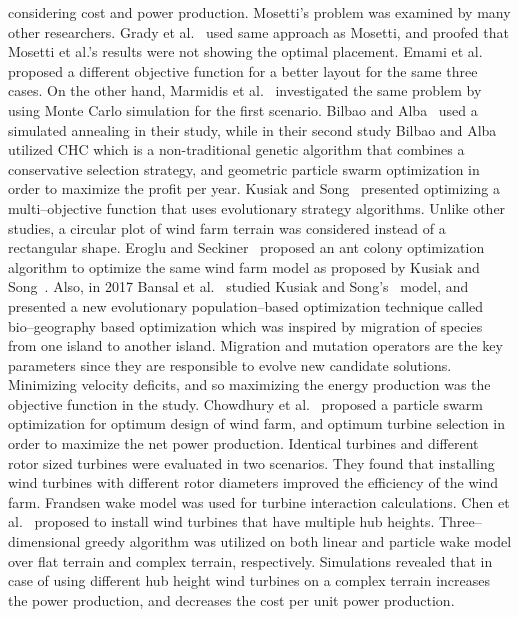 \documentclass[]{iptconf}
\begin{document}
considering cost and power production. Mosetti's problem was examined by many
other researchers. Grady et al.~\cite{Grady2005} used same approach as Mosetti, and proofed that
Mosetti et al.'s results were not showing the optimal placement. Emami et al.~\cite{Emami2010}
proposed a different objective function for a better layout for the same three cases.
On the other hand, Marmidis et al.~\cite{Marmidis2008} investigated the same problem by using
Monte Carlo simulation for the first scenario. Bilbao and Alba~\cite{Bilbao2009} used a simulated
annealing in their study, while in their second study Bilbao and Alba~\cite{Bilbao2009b} utilized
CHC which is a non-traditional genetic algorithm that combines a conservative
selection strategy, and geometric particle swarm optimization in order to maximize
the profit per year.
Kusiak and Song~\cite{Kusiak2010} presented optimizing a multi--objective function that uses
evolutionary strategy algorithms. Unlike other studies, a circular plot of wind farm
terrain was considered instead of a rectangular shape. Eroglu and Seckiner~\cite{Eroglu2012}
proposed an ant colony optimization algorithm to optimize the same wind farm
model as proposed by Kusiak and Song~\cite{Kusiak2010}. Also, in 2017 Bansal et al.~\cite{Bansal2017} studied
Kusiak and Song's~\cite{Kusiak2010} model, and presented a new evolutionary population--based
optimization technique called bio--geography based optimization which was inspired
by migration of species from one island to another island. Migration and mutation
operators are the key parameters since they are responsible to evolve new candidate
solutions. Minimizing velocity deficits, and so maximizing the energy production
was the objective function in the study.
Chowdhury et al.~\cite{Chowdhury2012} proposed a particle swarm optimization for optimum
design of wind farm, and optimum turbine selection in order to maximize the
net power production. Identical turbines and different rotor sized turbines were
evaluated in two scenarios. They found that installing wind turbines with different
rotor diameters improved the efficiency of the wind farm. Frandsen wake model
was used for turbine interaction calculations. Chen et al.~\cite{Chen2016} proposed to install
wind turbines that have multiple hub heights. Three--dimensional greedy algorithm
was utilized on both linear and particle wake model over flat terrain and complex
terrain, respectively. Simulations revealed that in case of using different hub height
wind turbines on a complex terrain increases the power production, and decreases
the cost per unit power production.
\end{document}
